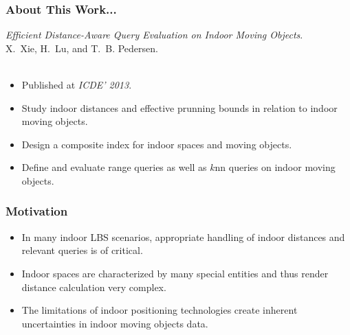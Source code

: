 \begin{frame}
\frametitle{About This Work...}

\emph{Efficient Distance-Aware Query Evaluation on Indoor Moving Objects}.~\cite{DBLP:conf/icde/XieLP13} \\
X.~Xie, H.~Lu, and T.~B. Pedersen.\\~\\

\begin{itemize}
  \item Published at \emph{ICDE' 2013}.
  \item Study indoor distances and effective prunning bounds in relation to indoor moving objects.
  \item Design a composite index for indoor spaces and moving objects.
  \item Define and evaluate range queries as well as $k$nn queries on indoor moving objects.
\end{itemize}

\end{frame}


\begin{frame}
\frametitle{Motivation}

\begin{itemize}
  \item In many indoor LBS scenarios, appropriate handling of indoor distances and relevant queries is of critical.

  \item Indoor spaces are characterized by many special entities and thus render distance calculation very complex.

  \item The limitations of indoor positioning technologies create inherent uncertainties in indoor moving objects data.

\end{itemize}

\end{frame}


